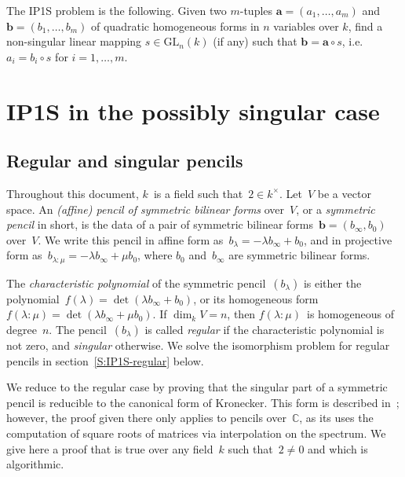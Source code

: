 \documentclass{lms}%
\begin{document}
\begin{definition}%
The IP1S problem is the following. 
Given two $m$-tuples $\bm{a} = (a_1, \ldots, a_{m})$ and {$\bm{b} = (b_1, \ldots, b_{m})$}  of quadratic homogeneous forms in $n$ variables over $k$, find a non-singular linear mapping $s \in \mathrm{GL}_n(k)$ (if any) such that $\bm{b} = \bm{a} \circ s$, i.e. $a_i = b_i \circ s$ for $i= 1, \ldots, m$.  
\end{definition}

\section{IP1S in the possibly singular case}%
\label{S:IP1S-singular}
\subsection{Regular and singular pencils}%
Throughout this document, $k$~is a field such that~$2 ∈ k^{×}$. Let~$V$
be a vector space. An \emph{(affine) pencil of symmetric bilinear forms}
over~$V$, or a \emph{symmetric pencil} in short, is the data of a pair of
symmetric bilinear forms~$\bm{b} = (b_{∞}, b_{0})$ over~$V$. We write
this pencil in affine form as~$b_{λ} = -λ b_{∞} + b_{0}$, and in
projective form as~$b_{λ:μ} = -λ b_{∞} + μ b_{0}$, where $b_{0}$
and~$b_{∞}$ are symmetric bilinear forms.

The \emph{characteristic polynomial} of the symmetric pencil~$(b_{λ})$ is
either the polynomial~$f(λ) = \det (λ b_{∞} + b_{0})$, or its homogeneous
form~$f(λ: μ) = \det (λ b_{∞} + μ b_{0})$. If $\dim_{k} V = n$, then
$f(λ: μ)$~is homogeneous of degree~$n$. The pencil~$(b_{λ})$ is called
\emph{regular} if the characteristic polynomial is not zero, and
\emph{singular} otherwise. We solve the isomorphism problem for regular
pencils in section~\ref{S:IP1S-regular} below.

We reduce to the regular case by proving that the singular part of a
symmetric pencil is reducible to the canonical form of Kronecker. This
form is described in~\cite[XII(56)]{Gantmacher2}; however, the proof
given there only applies to pencils over~$ℂ$, as its uses the computation
of square roots of matrices via interpolation on the spectrum. We give
here a proof that is true over any field~$k$ such that~$2 ≠ 0$ and which
is algorithmic.
\end{document}
